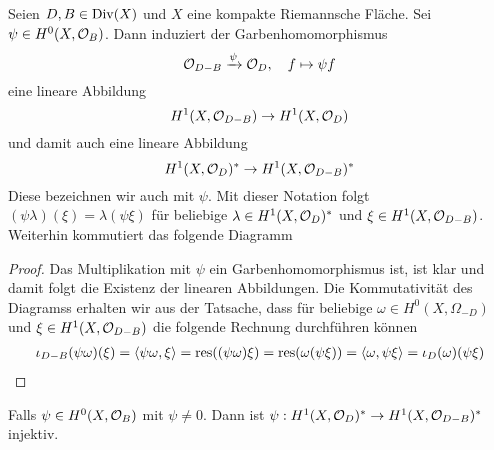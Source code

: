 \begin{lemma}
  Seien $D,B \in \operatorname{Div}(X)$ und $X$ eine kompakte Riemannsche
  Fläche. Sei $\psi \in H^0(X,\mathcal{O}_B)$. Dann induziert der
  Garbenhomomorphismus
  \[
  \mathcal{O}_{D-B} \xrightarrow{\psi} \mathcal{O}_D, \quad f \mapsto \psi f
  \] 
  eine lineare Abbildung
  \[
  H^1(X, \mathcal{O}_{D-B}) \rightarrow H^1(X, \mathcal{O}_D)
  \]
  und damit auch eine lineare Abbildung
  \[
  H^1(X, \mathcal{O}_D)^\ast \rightarrow H^1(X, \mathcal{O}_{D-B})^\ast
  \]
  Diese bezeichnen wir auch mit $\psi$. Mit dieser Notation folgt
  $(\psi \lambda)(\xi) = \lambda(\psi \xi)$ für beliebige $\lambda \in
  H^1(X, \mathcal{O}_D)^\ast$ und $\xi \in H^1(X, \mathcal{O}_{D-B})$. Weiterhin
  kommutiert das folgende Diagramm
  \begin{center}
  \end{center}
\end{lemma}

\begin{proof}
  Das Multiplikation mit $\psi$ ein Garbenhomomorphismus ist, ist klar
  und damit folgt die Existenz der linearen Abbildungen. Die
  Kommutativität des Diagramss erhalten wir aus der Tatsache, dass für
  beliebige $\omega \in H^0(X, \Omega_{-D})$ und $\xi \in H^1(X,
  \mathcal{O}_{D-B})$ die folgende Rechnung durchführen können
  \begin{align*}
    \iota_{D-B}(\psi \omega)(\xi) = \langle \psi \omega, \xi \rangle = \operatorname{res}((\psi
    \omega) \xi) = \operatorname{res}(\omega (\psi \xi)) = \langle \omega, \psi \xi \rangle =
    \iota_D(\omega)(\psi \xi)
  \end{align*}
\end{proof}

\begin{lemma}
  \label{lemma:psi-inj}
  Falls $\psi \in H^0(X, \mathcal{O}_B)$ mit $\psi \neq 0$. Dann ist $\psi:
  H^1(X, \mathcal{O}_D)^\ast \rightarrow H^1(X, \mathcal{O}_{D-B})^\ast$ injektiv.
\end{lemma}

